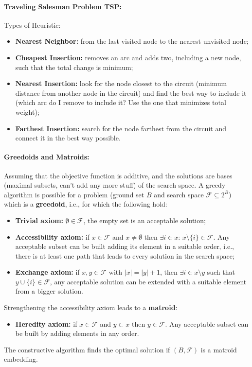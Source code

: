 \documentclass{article}
\begin{document}
	\paragraph{Traveling Salesman Problem TSP:} Types of Heuristic: 
	\begin{itemize}
		\item \textbf{Nearest Neighbor:} from the last visited node to the nearest unvisited node;
		\item \textbf{Cheapest Insertion:} removes an arc and adds two, including a new node, such that the total change is minimum;
		\item \textbf{Nearest Insertion:} look for the node closest to the circuit (minimum distance from another node in the circuit) and find the best way to include it (which arc do I remove to include it? Use the one that minimizes total weight);
		\item \textbf{Farthest Insertion:} search for the node farthest from the circuit and connect it in the best way possible.\\
	\end{itemize}
	
	\paragraph{Greedoids and Matroids:} Assuming that the objective function is additive, and the solutions are bases (maximal subsets, can't add any more stuff) of the search space. A greedy algorithm is possible for a problem (ground set $B$ and search space $\mathcal{F} \subseteq 2^B$) which is a \textbf{greedoid}, i.e., for which the following hold: 
	\begin{itemize}
		\item \textbf{Trivial axiom:} $\emptyset \in \mathcal{F}$, the empty set is an acceptable solution;
		\item \textbf{Accessibility axiom:} if $x \in \mathcal{F}$ and $x \neq \emptyset$ then $\exists i \in x : \, x \setminus \{i\} \in \mathcal{F}$. Any acceptable subset can be built adding its element in a suitable order, i.e., there is at least one path that leads to every solution in the search space;
		\item \textbf{Exchange axiom:}  if $x, y \in \mathcal{F}$ with $|x| = |y| + 1$, then $\exists i \in x \setminus y$ such that $y \cup \{i\} \in \mathcal{F}$, any acceptable solution can be extended with a suitable element from a bigger solution.
	\end{itemize}
	Strengthening the accessibility axiom leads to a \textbf{matroid}: 
	\begin{itemize}
		\item \textbf{Heredity axiom:} if $x \in \mathcal{F}$ and $y \subset x$ then $y \in \mathcal{F}$. Any acceptable subset can be built by adding elements in any order.\\
	\end{itemize}
	The constructive algorithm finds the optimal solution if $(B, \mathcal{F})$ is a matroid embedding.\\
	
\end{document}
